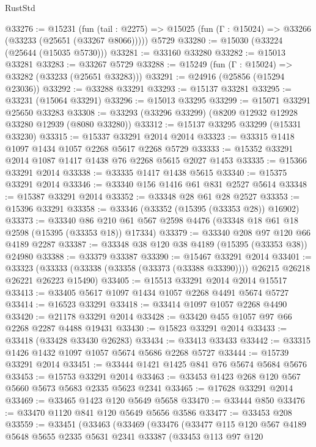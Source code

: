 \begin{lexlean}{RustStd}
\begin{coremodule}
@33276 := @15231
    (fun (tail : @2275) => @15025 (fun (Γ : @15024) => @33266 (@33233 (@25651 (@33267 @8066)))))
    @5729
@33280 := @15030 (@33224 (@25644 (@15035 @5730)))
@33281 := @33160 @33280
@33282 := @15013 @33281
@33283 := @33267 @5729
@33288 := @15249 (fun (Γ : @15024) => @33282 (@33233 (@25651 @33283)))
@33291 := @24916 (@25856 (@15294 @23036))
@33292 := @33288 @33291
@33293 := @15137 @33281
@33295 := @33231 (@15064 @33291)
@33296 := @15013 @33295
@33299 := @15071 @33291 @25650 @33283
@33308 := @33293 (@33296 @33299) (@8209 @12932 @12928 @33280 @12939 (@8080 @33280))
@33312 := @15137 @33295 @33299 (@15331 @33230)
@33315 := @15337 @33291 @2014 @2014
@33323 := @33315 @1418 @1097 @1434 @1057 @2268 @5617 @2268 @5729
@33333 := @15352 @33291 @2014 @1087 @1417 @1438 @76 @2268 @5615 @2027 @1453
@33335 := @15366 @33291 @2014
@33338 := @33335 @1417 @1438 @5615
@33340 := @15375 @33291 @2014
@33346 := @33340 @156 @1416 @61 @831 @2527 @5614
@33348 := @15387 @33291 @2014
@33352 := @33348 @28 @61 @28 @2527
@33353 := @15396 @33291
@33358 := @33346 (@33352 (@15395 (@33353 @28)) @16902)
@33373 := @33340
    @86
    @210
    @61
    @567
    @2598
    @4476
    (@33348 @18 @61 @18 @2598 (@15395 (@33353 @18)) @17334)
@33379 := @33340 @208 @97 @120 @66 @4189 @2287
@33387 := @33348 @38 @120 @38 @4189 (@15395 (@33353 @38)) @24980
@33388 := @33379 @33387
@33390 := @15467 @33291 @2014
@33401 := @33323
    (@33333 (@33338 (@33358 (@33373 (@33388 @33390)))) @26215 @26218 @26221 @26223 @15490)
@33405 := @15513 @33291 @2014 @2014 @15517
@33413 := @33405 @5617 @1097 @1434 @1057 @2268 @4491 @5674 @5727
@33414 := @16523 @33291
@33418 := @33414 @1097 @1057 @2268 @4490
@33420 := @21178 @33291 @2014
@33428 := @33420 @455 @1057 @97 @66 @2268 @2287 @4488 @19431
@33430 := @15823 @33291 @2014
@33433 := @33418 (@33428 @33430 @26283)
@33434 := @33413 @33433
@33442 := @33315 @1426 @1432 @1097 @1057 @5674 @5686 @2268 @5727
@33444 := @15739 @33291 @2014
@33451 := @33444 @1421 @1425 @841 @76 @5674 @5684 @5676
@33453 := @15753 @33291 @2014
@33463 := @33453 @1423 @268 @120 @567 @5660 @5673 @5683 @2335 @5623 @2341
@33465 := @17628 @33291 @2014
@33469 := @33465 @1423 @120 @5649 @5658
@33470 := @33444 @850
@33476 := @33470 @1120 @841 @120 @5649 @5656 @3586
@33477 := @33453 @208
@33559 := @33451
    (@33463
      (@33469
        (@33476
          (@33477
            @115
            @120
            @567
            @4189
            @5648
            @5655
            @2335
            @5631
            @2341
            @33387
            (@33453
              @113
              @97
              @120

\end{coremodule}
\end{lexlean}
